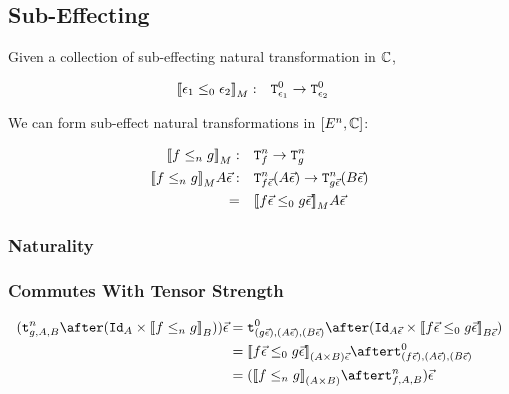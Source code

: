 \documentclass{report}
\begin{document}
\subsection{Sub-Effecting}
Given a collection of sub-effecting natural transformation in $\mathbb{C}$,

\begin{align}
    {\bf [\![}\epsilon_1\leq_0 \epsilon_2{\bf ]\!]}_M:&\quad \texttt{T}^0_{\epsilon_1} \rightarrow \texttt{T}^0_{\epsilon_2}
\end{align}

We can form sub-effect natural transformations in $[E^n, \mathbb{C}]$:

\begin{align}
    {\bf [\![}f\leq_n g{\bf ]\!]}_M:&\quad\texttt{T}^n_{f}\rightarrow \texttt{T}^n_{g}\\
    {\bf [\![}f\leq_n g{\bf ]\!]}_M A \vec{\epsilon}:&\quad\texttt{T}^n_{f\vec{\epsilon}}(A\vec{\epsilon})\rightarrow \texttt{T}^n_{g\vec{\epsilon}}(B\vec{\epsilon})\\
    =&\quad {\bf [\![}f\vec{\epsilon}\leq_0 g\vec{\epsilon}{\bf ]\!]}_MA\vec{\epsilon}
\end{align}

\subsubsection{Naturality}


\subsubsection{Commutes With Tensor Strength}


\begin{align}
    (\tstrengthn{g}{A}{B}\after(\Id{A}\times \db{f\subeffectn g}_B))\ev & = \tstrengthz{(g\ev)}{(A\ev)}{(B\ev)}\after(\Id{A\ev}\times \db{f\ev \subeffectz g\ev}_{B\ev})\\
    & = \db{f\ev \subeffectz g\ev}_{(A\times B)\ev} \after\tstrengthz{(f\ev)}{(A\ev)}{(B\ev)}\\
    & = (\db{f \subeffectn g}_{(A\times B)} \after\tstrengthn{f}{A}{B})\ev\\
\end{align}
\end{document}
